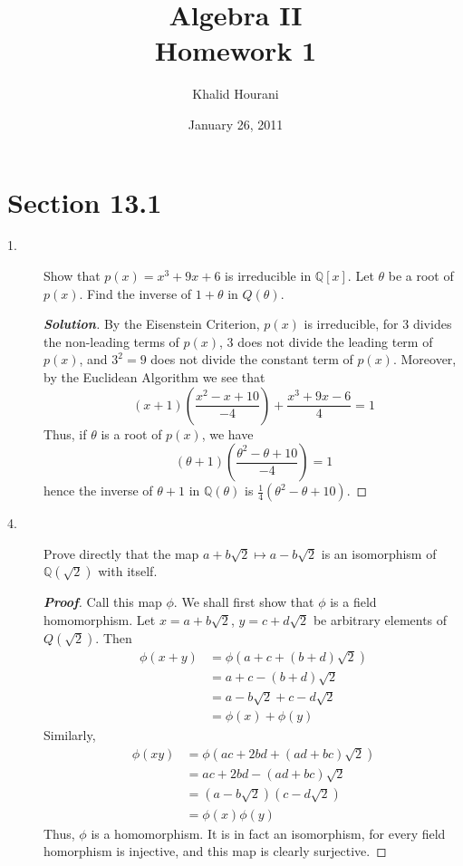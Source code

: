 \documentclass[12pt,leqno]{book}
\title{Algebra II\\\large Homework 1}
\date{January 26, 2011}
\author{Khalid Hourani}
\theoremstyle{definition}
\newcommand{\Q}{\mathbb{Q}}
\newenvironment{Proof}{\begin{proof}[\textnormal{\textbf{Proof}}]}{\end{proof}}
\newenvironment{Solution}{\begin{proof}[\textnormal{\textbf{Solution}}]}{\end{proof}}
\begin{document}
 \begin{titlepage}
  \maketitle
 \end{titlepage}

\section*{Section 13.1}
\begin{description}
 \item [1.] Show that $p(x)=x^3+9x+6$ is irreducible in $\Q[x]$. Let $\theta$ be a root of $p(x)$. Find the inverse of $1+\theta$ in $Q(\theta)$. 
  \begin{Solution}
   By the Eisenstein Criterion, $p(x)$ is irreducible, for 3 divides the non-leading terms of $p(x)$, 3 does not divide the leading term of $p(x)$, and $3^2=9$ does not divide the constant term of $p(x)$. Moreover, by the Euclidean Algorithm we see that \[(x+1)\left(\frac{x^2-x+10}{-4}\right)+\frac{x^3+9x-6}{4}=1\] Thus, if $\theta$ is a root of $p(x)$, we have \[(\theta+1)\left(\frac{\theta^2-\theta+10}{-4}\right)=1\] hence the inverse of $\theta+1$ in $\Q(\theta)$ is $\frac{1}{4}(\theta^2-\theta+10)$.
  \end{Solution}
 \item [4.] Prove directly that the map $a+b\sqrt{2}\mapsto a-b\sqrt{2}$ is an isomorphism of $\Q(\sqrt{2})$ with itself. 
  \begin{Proof}
   Call this map $\phi$. We shall first show that $\phi$ is a field homomorphism. Let $x=a+b\sqrt{2}$, $y=c+d\sqrt{2}$ be arbitrary elements of $Q(\sqrt{2})$. Then \begin{align*}\phi(x+y)&=\phi\left(a+c+(b+d)\sqrt{2}\right)\\&=a+c-(b+d)\sqrt{2}\\&=a-b\sqrt{2}+c-d\sqrt{2}\\&=\phi(x)+\phi(y)\end{align*} Similarly, \begin{align*}\phi(xy)&=\phi\left(ac+2bd+(ad+bc)\sqrt{2}\right)\\&=ac+2bd-(ad+bc)\sqrt{2}\\&=(a-b\sqrt{2})(c-d\sqrt{2})\\&=\phi(x)\phi(y)\end{align*} Thus, $\phi$ is a homomorphism. It is in fact an isomorphism, for every field homorphism is injective, and this map is clearly surjective.

\end{Proof}
\end{description}
\end{document}
